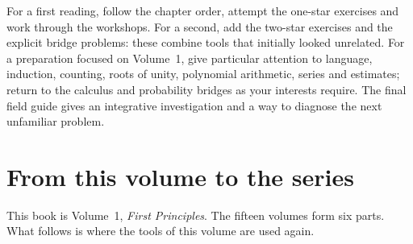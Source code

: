 For a first reading, follow the chapter order, attempt the one-star exercises and
work through the workshops. For a second, add the two-star exercises and the
explicit bridge problems: these combine tools that initially looked unrelated.
For a preparation focused on Volume~1, give particular attention to language,
induction, counting, roots of unity, polynomial arithmetic, series and estimates;
return to the calculus and probability bridges as your interests require. The
final field guide gives an integrative investigation and a way to diagnose the
next unfamiliar problem.

\section*{From this volume to the series}
This book is Volume~1, \emph{First Principles}. The fifteen volumes form six parts.
What follows is where the tools of this volume are used again.


